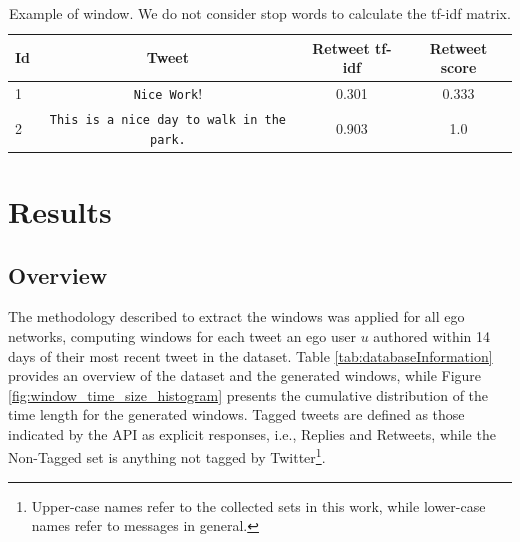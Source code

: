 \begin{table}[!tbh]
	\fontsize{9pt}{10pt}\selectfont
	\centering
		\begin{tabular}{|l|c|c|c|}
			\hline
			Id & Tweet & Retweet tf-idf & Retweet score\\ \hline
			1 & \verb!Nice Work!! & 0.301 & 0.333 \\ \hline
			2 & \verb!This is a nice day to walk in the park.! & 0.903 & 1.0 \\ \hline
		\end{tabular}
		\caption{Example of window. We do not consider stop words to calculate the tf-idf matrix.}
	\label{tab:windowExample}
\end{table}

\section{Results}

\subsection{Overview}

The methodology described to extract the windows was applied for all \totalUsers{} ego networks, computing windows for each tweet an ego user $u$ authored within 14 days of their most recent tweet in the dataset. 
Table \ref{tab:databaseInformation} provides an overview of the dataset and the generated windows, while Figure \ref{fig:window_time_size_histogram} presents the cumulative distribution of the time length for the generated windows.  
Tagged tweets are defined as those indicated by the API as explicit responses, i.e., Replies and Retweets, while the Non-Tagged set is anything not tagged by Twitter\footnote{\label{datasets}Upper-case names refer to the collected sets in this work, while lower-case names refer to messages in general.}. 

